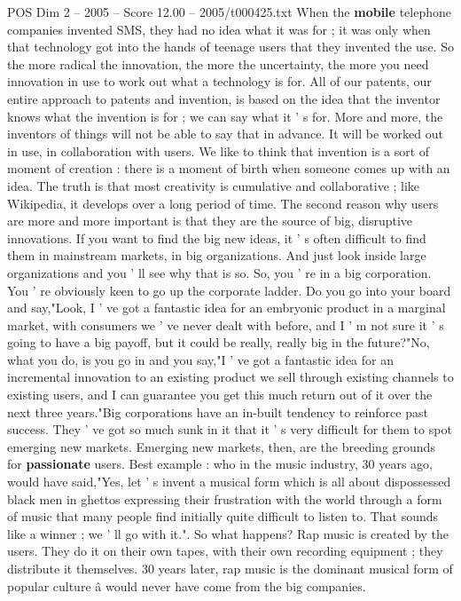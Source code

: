 \begin{textsample}{POS Dim 2 – 2005 – Score 12.00 – 2005/t000425.txt}
When the \textbf{mobile} telephone companies invented SMS, they had no idea what it was for ; it was only when that technology got into the hands of teenage users that they invented the use.
So the more radical the innovation, the more the uncertainty, the more you need innovation in use to work out what a technology is for.
All of our patents, our entire approach to patents and invention, is based on the idea that the inventor knows what the invention is for ; we can say what it ' s for.
More and more, the inventors of things will not be able to say that in advance.
It will be worked out in use, in collaboration with users.
We like to think that invention is a sort of moment of creation : there is a moment of birth when someone comes up with an idea.
The truth is that most creativity is cumulative and collaborative ; like Wikipedia, it develops over a long period of time.
The second reason why users are more and more important is that they are the source of big, disruptive innovations.
If you want to find the big new ideas, it ' s often difficult to find them in mainstream markets, in big organizations.
And just look inside large organizations and you ' ll see why that is so.
So, you ' re in a big corporation.
You ' re obviously keen to go up the corporate ladder.
Do you go into your board and say,"Look, I ' ve got a fantastic idea for an embryonic product in a marginal market, with consumers we ' ve never dealt with before, and I ' m not sure it ' s going to have a big payoff, but it could be really, really big in the future?"No, what you do, is you go in and you say,"I ' ve got a fantastic idea for an incremental innovation to an existing product we sell through existing channels to existing users, and I can guarantee you get this much return out of it over the next three years."Big corporations have an in-built tendency to reinforce past success.
They ' ve got so much sunk in it that it ' s very difficult for them to spot emerging new markets.
Emerging new markets, then, are the breeding grounds for \textbf{passionate} users.
Best example : who in the music industry, 30 years ago, would have said,"Yes, let ' s invent a musical form which is all about dispossessed black men in ghettos expressing their frustration with the world through a form of music that many people find initially quite difficult to listen to.
That sounds like a winner ; we ' ll go with it.".
So what happens?
Rap music is created by the users.
They do it on their own tapes, with their own recording equipment ; they distribute it themselves. 30 years later, rap music is the dominant musical form of popular culture â would never have come from the big companies.

\end{textsample}

